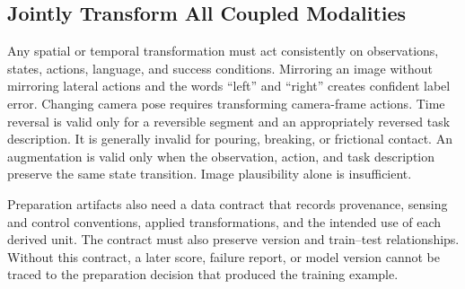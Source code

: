 \subsection{Jointly Transform All Coupled Modalities}

Any spatial or temporal transformation must act consistently on observations, states, actions, language, and success conditions.
Mirroring an image without mirroring lateral actions and the words ``left'' and ``right'' creates confident label error.
Changing camera pose requires transforming camera-frame actions.
Time reversal is valid only for a reversible segment and an appropriately reversed task description.
It is generally invalid for pouring, breaking, or frictional contact.
An augmentation is valid only when the observation, action, and task description preserve the same state transition.
Image plausibility alone is insufficient.

Preparation artifacts also need a data contract that records provenance, sensing and control conventions, applied transformations, and the intended use of each derived unit.
The contract must also preserve version and train--test relationships.
Without this contract, a later score, failure report, or model version cannot be traced to the preparation decision that produced the training example.
